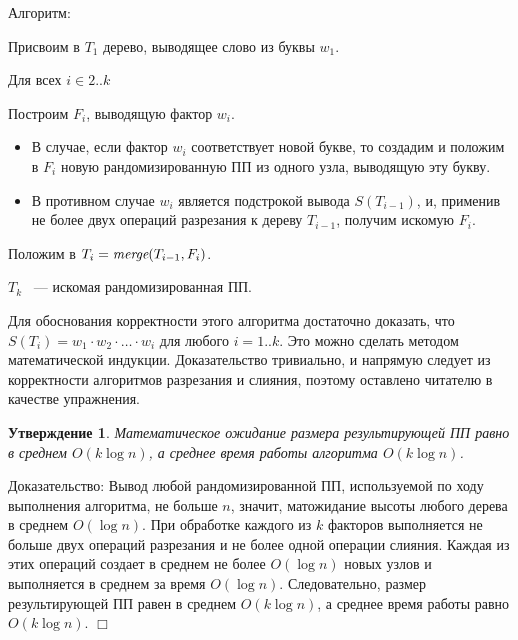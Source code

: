 \documentclass[14pt]{article}
\newtheorem{claim}{Утверждение}[section]
\begin{document}
{\sc Алгоритм:}
\begin{enumerate}
	\begin{item}
		Присвоим в $T_1$ дерево, выводящее слово из буквы $w_1$.
	\end{item}
	\begin{item}
		Для всех $i \in 2..k$
		\begin{enumerate}
			\begin{item}
				Построим $F_i$, выводящую фактор $w_i$.
				\begin{itemize}
					\item В случае, если фактор $w_i$ соответствует новой букве, то создадим и положим
						в $F_i$ новую рандомизированную ПП из одного узла, выводящую эту букву.
					\item В противном случае $w_i$ является подстрокой вывода $S(T_{i-1})$, и, применив не более двух
						операций разрезания к дереву $T_{i-1}$, получим искомую $F_i$.
				\end{itemize}
			\end{item}
			\begin{item}
				Положим в $T_i = \emph{merge}(T_{i-1}, F_i)$.
			\end{item}
		\end{enumerate}
	\end{item}
	\begin{item}
		$T_k$ ~--- искомая рандомизированная ПП.
	\end{item}
\end{enumerate}


Для обоснования корректности этого алгоритма достаточно доказать, что $S(T_i) = w_1 \cdot w_2 \cdot \ldots \cdot w_i$ для любого $i = 1..k$.
Это можно сделать методом математической индукции. Доказательство тривиально, и напрямую следует из корректности алгоритмов
разрезания и слияния, поэтому оставлено читателю в качестве упражнения.

\begin{claim}
	Математическое ожидание размера результирующей ПП равно в среднем $O(k\log n)$, а среднее время работы алгоритма $O(k\log n)$.
\end{claim}

{\sc Доказательство:} Вывод любой рандомизированной ПП, используемой по ходу выполнения алгоритма, не больше $n$, значит, матожидание высоты любого
дерева в среднем $O(\log n)$. При обработке каждого из $k$ факторов выполняется не больше двух операций разрезания и не более одной
операции слияния. Каждая из этих операций создает в среднем не более $O(\log n)$ новых узлов и выполняется в среднем за время $O(\log n)$.
Следовательно, размер результирующей ПП равен в среднем $O(k\log n)$, а среднее время работы равно $O(k\log n)$. $\Box$
\end{document}
